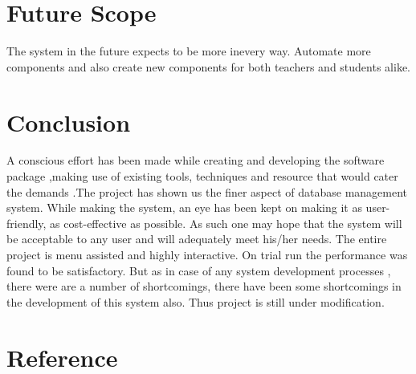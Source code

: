 \documentclass{article}
\begin{document}
\newpage

\section{Future Scope}
\vspace{1em}
The  system in the future expects to be more inevery way. Automate more components and also create new components for both teachers and students alike.


\newpage

\section{Conclusion}
\vspace{1em}
A conscious effort has been made while creating and developing the software package ,making use of existing tools, techniques and resource that would cater the demands .The project has shown us the finer aspect of database management system.
While making the system, an eye has been kept on making it as user-friendly, as cost-effective as possible. As such one may hope that the system will be acceptable to any user and will adequately meet his/her needs. The entire project is menu assisted and highly interactive. On trial run the performance was found to be satisfactory. But as in case of any system development processes , there were are a number of shortcomings, there have been some shortcomings in the development of this system also. Thus project is still under modification.

\newpage


\section{Reference}
\vspace{1em}


\newpage
\end{document}

